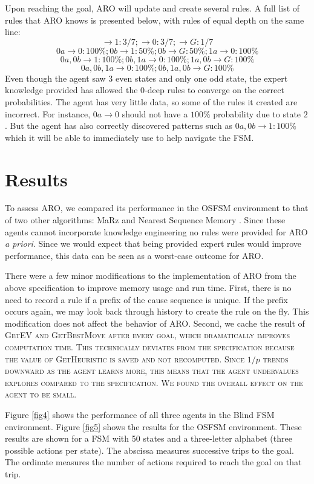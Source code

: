 \documentclass[letterpaper]{article} %
\begin{document}
Upon reaching the goal, ARO will update and create several rules. A full list of rules that ARO knows is presented below, with rules of equal depth on the same line:
$$\rightarrow 1: 3/7; \rightarrow 0: 3/7; \rightarrow G: 1/7$$
$$0a \rightarrow 0: 100\%; 0b \rightarrow 1: 50\%; 0b \rightarrow G: 50\%; 1a \rightarrow 0: 100\%$$
$$0a, 0b \rightarrow 1: 100\%; 0b, 1a \rightarrow 0: 100\%; 1a, 0b \rightarrow G: 100\%$$
$$0a, 0b, 1a \rightarrow 0: 100\%; 0b, 1a, 0b \rightarrow G: 100\%$$
Even though the agent saw 3 even states and only one odd state, the expert knowledge provided has allowed the 0-deep rules to converge on the correct probabilities. The agent has very little data, so some of the rules it created are incorrect. For instance, $0a \rightarrow 0$ should not have a $100\%$ probability due to state $2$. But the agent has also correctly discovered patterns such as $0a, 0b \rightarrow 1: 100\%$ which it will be able to immediately use to help navigate the FSM.


\section{Results}

To assess ARO, we compared its performance in the OSFSM environment to
that of two other algorithms: MaRz \cite{Rodriguez17} and Nearest
Sequence Memory \cite{McCallumNSM95}. Since these agents cannot incorporate knowledge engineering no rules were provided for ARO \textit{a priori}. Since we would expect that being provided expert rules would improve performance, this data can be seen as a worst-case outcome for ARO.

There were a few minor modifications to the implementation of ARO from
the above specification to improve memory usage and run time. First,
there is no need to record a rule if a prefix of the cause sequence is
unique. If the prefix occurs again, we may look back through history
to create the rule on the fly. This modification does not affect the
behavior of ARO. Second, we cache the result of \scshape
GetEV \normalfont and \scshape GetBestMove \normalfont after every
goal, which dramatically improves computation time. This technically
deviates from the specification because the value of \scshape
GetHeuristic \normalfont is saved and not recomputed. Since $1/p$
trends downward as the agent learns more, this means that the agent
undervalues explores compared to the specification. We found the
overall effect on the agent to be small.

Figure \ref{fig4} shows the performance of all three agents in the
Blind FSM environment.  Figure \ref{fig5} shows the results for the
OSFSM environment.  These results are shown for a FSM with 50 states
and a three-letter alphabet (three possible actions per state).  The
abscissa measures successive trips to the goal.  The ordinate measures
the number of actions required to reach the goal on that trip.
\end{document}
